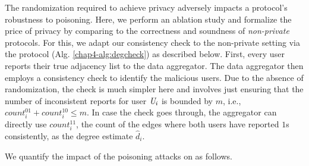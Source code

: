%      

The randomization required to achieve privacy adversely impacts a protocol's robustness to poisoning. Here, we perform an ablation study and formalize the price of privacy by comparing to the correctness and soundness of \textit{non-private} protocols. For this, we adapt our consistency check to the non-private setting via the \DegCheck{} protocol (Alg. \ref{chap4-alg:degcheck}) as described below. First, every user reports their true adjacency list to the data aggregator. The data aggregator then employs a consistency check to identify the malicious users. Due to the absence of randomization, the check is much simpler here and involves just ensuring that the number of inconsistent reports for user $\textit{U}_i$ is bounded by $m$, i.e., $count_i^{01}+count_i^{10} \leq m $. In case the check goes through, the aggregator can directly use $count_i^{11}$, the count of the edges where both users have reported $1$s consistently, as the degree estimate $\hat{d}_i$.

We quantify the impact of the poisoning attacks on  \DegCheck{} as follows.

